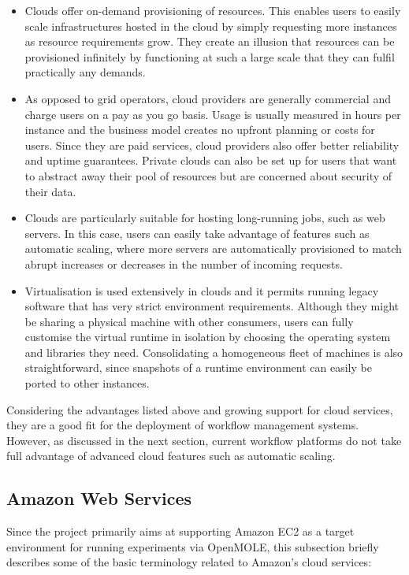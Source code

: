 \begin{itemize}
	\item Clouds offer on-demand provisioning of resources. This enables users to easily scale infrastructures hosted in the cloud by simply requesting more instances as resource requirements grow. They create an illusion that resources can be provisioned infinitely by functioning at such a large scale that they can fulfil practically any demands.
	\item As opposed to grid operators, cloud providers are generally commercial and charge users on a pay as you go basis. Usage is usually measured in hours per instance and the business model creates no upfront planning or costs for users. Since they are paid services, cloud providers also offer better reliability and uptime guarantees. Private clouds can also be set up for users that want to abstract away their pool of resources but are concerned about security of their data.
	\item Clouds are particularly suitable for hosting long-running jobs, such as web servers. In this case, users can easily take advantage of features such as automatic scaling, where more servers are automatically provisioned to match abrupt increases or decreases in the number of incoming requests.
	\item Virtualisation is used extensively in clouds and it permits running legacy software that has very strict environment requirements. Although they might be sharing a physical machine with other consumers, users can fully customise the virtual runtime in isolation by choosing the operating system and libraries they need. Consolidating a homogeneous fleet of machines is also straightforward, since snapshots of a runtime environment can easily be ported to other instances.
\end{itemize}

Considering the advantages listed above and growing support for cloud services, they are a good fit for the deployment of workflow management systems. However, as discussed in the next section, current workflow platforms do not take full advantage of advanced cloud features such as automatic scaling.

\subsection{Amazon Web Services}

Since the project primarily aims at supporting Amazon EC2 as a target environment for running experiments via OpenMOLE, this subsection briefly describes some of the basic terminology related to Amazon's cloud services:

